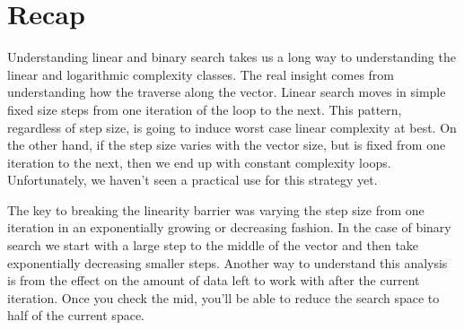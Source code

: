 \documentclass[]{tufte-handout}
\begin{document}
\section{Recap}

Understanding linear and binary search takes us a long way to understanding the linear and logarithmic complexity classes. The real insight comes from understanding how the traverse along the vector. Linear search moves in simple fixed size steps from one iteration of the loop to the next. This pattern, regardless of step size, is going to induce worst case linear complexity at best.  On the other hand, if the step size varies with the vector size, but is fixed from one iteration to the next, then we end up with constant complexity loops. Unfortunately, we haven't seen a practical use for this strategy yet. 

The key to breaking the linearity barrier was varying the step size from one iteration in an exponentially growing or decreasing fashion. In the case of binary search we start with a large step to the middle of the vector and then take exponentially decreasing smaller steps.  Another way to understand this analysis is from the effect on the amount of data left to work with after the current iteration. Once you check the mid, you'll be able to reduce the search space to half of the current space.   
\end{document}
